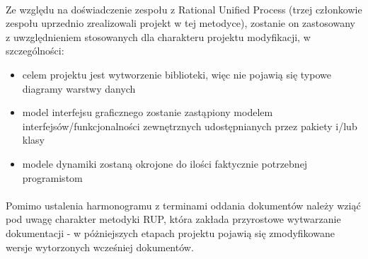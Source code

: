 \documentclass[a4paper,10pt]{article}
\begin{document}
\paragraph{} Ze względu na doświadczenie zespołu z Rational Unified Process (trzej członkowie zespołu uprzednio zrealizowali projekt w tej metodyce), zostanie on zastosowany z uwzględnieniem stosowanych dla charakteru projektu modyfikacji, w szczególności:
\begin{itemize}
 \item celem projektu jest wytworzenie biblioteki, więc nie pojawią się typowe diagramy warstwy danych
\item model interfejsu graficznego zostanie zastąpiony modelem interfejsów/funkcjonalności zewnętrznych udostępnianych przez pakiety i/lub klasy
\item modele dynamiki zostaną okrojone do ilości faktycznie potrzebnej programistom
\end{itemize}
\paragraph{}Pomimo ustalenia harmonogramu z terminami oddania dokumentów należy wziąć pod uwagę charakter metodyki RUP, która zakłada przyrostowe wytwarzanie dokumentacji - w póżniejszych etapach projektu pojawią się zmodyfikowane wersje wytorzonych wcześniej dokumentów.


\clearpage
{}
{}

\end{document}
